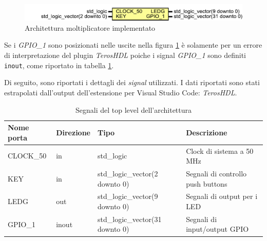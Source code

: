 \documentclass[titlepage]{report}
\begin{document}
			\begin{figure}[H]
				\centering
				\includegraphics[scale=0.6]{./img/basic_mult_module_teros.pdf}
				\caption{Architettura moltiplicatore implementato}
				\label{fig:basic_mult_module_teros}
			\end{figure}

			Se i \textit{GPIO\_1} sono posizionati nelle uscite nella figura \ref{fig:basic_mult_module_teros} è solamente per un errore di interpretazione del plugin \textit{TerosHDL} poiche i signal \textit{GPIO\_1} sono definiti \texttt{inout}, come riportato in tabella \ref{tab:signal_arch_basic_mult}.

			Di seguito, sono riportati i dettagli dei \textit{signal} utilizzati. I dati riportati sono stati estrapolati dall'output dell'estensione per Visual Studio Code: \textit{TerosHDL}.

			\begin{table}[H]
			\centering
			\begin{tabular}{|p{}|p{}|p{}|p{}|}
				\hline
				\textbf{Nome porta} & \textbf{Direzione} & \textbf{Tipo} & \textbf{Descrizione} \\
				\hline
				CLOCK\_50 & in & std\_logic & Clock di sistema a 50 MHz \\
				KEY & in & std\_logic\_vector(2 downto 0) & Segnali di controllo push buttons \\
				LEDG & out & std\_logic\_vector(9 downto 0) & Segnali di output per i LED \\
				GPIO\_1 & inout & std\_logic\_vector(31 downto 0) & Segnali di input/output GPIO \\
				\hline
			\end{tabular}
			\caption{Segnali del top level dell'architettura}
			\label{tab:signal_arch_basic_mult}
		\end{table}
\end{document}
